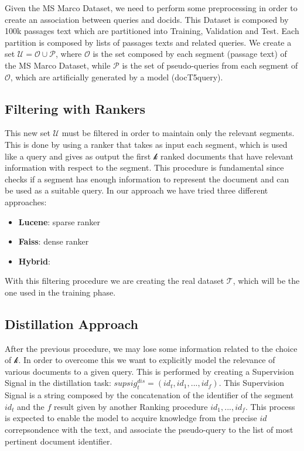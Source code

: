 Given the MS Marco Dataset, we need to perform some preprocessing in order to create an association between queries and docids.
This Dataset is composed by 100k passages text which are partitioned into Training, Validation and Test. Each partition is composed by lists of passages texts and related queries.
We create a set $\mathcal{U} = \mathcal{O} \cup \mathcal{P}$, where $\mathcal{O}$ is the set composed by each segment (passage text) of the MS Marco Dataset, while $\mathcal{P}$ is the set of pseudo-queries from each segment of $\mathcal{O}$, which are artificially generated by a model (docT5query).

\subsection{Filtering with Rankers}
This new set $\mathcal{U}$ must be filtered in order to maintain only the relevant segments. 
This is done by using a ranker that takes as input each segment, which is used like a query and gives as output the first $\mathcal{k}$ ranked documents that have relevant information with respect to the segment.
This procedure is fundamental since checks if a segment has enough information to represent the document and can be used as a suitable query.
In our approach we have tried three different approaches:
\begin{itemize}
    \item \textbf{Lucene}: sparse ranker
    \item \textbf{Faiss}: dense ranker 
    \item \textbf{Hybrid}:
\end{itemize}
With this filtering procedure we are creating the real dataset $\mathcal{T}$, which will be the one used in the training phase. 

\subsection{Distillation Approach}
After the previous procedure, we may lose some information related to the choice of $\mathcal{k}$. In order to overcome this we want to explicitly model the relevance of various documents to a given query. This is performed by creating a Supervision Signal in the distillation task: $supsig_{t}^{dis} = (id_{t}, id_{1}, ..., id_{f})$.
This Supervision Signal is a string composed by the concatenation of the identifier of the segment $id_{t}$ and the $f$ result given by another Ranking procedure $id_{1}, ..., id_{f}$.
This process is expected to enable the model to acquire knowledge from the precise $id$ correpsondence with the text, and associate the pseudo-query to the list of most pertinent document identifier.
